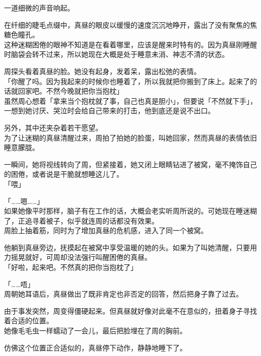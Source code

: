 一道细微的声音响起。

在纤细的睫毛点缀中，真昼的眼皮以缓慢的速度沉沉地睁开，露出了没有聚焦的焦糖色瞳孔。\\

这种迷糊困倦的眼神不知道是在看着哪里，应该是醒来时特有的。因为真昼刚睡醒时脑袋会转不过来，所以她现在大概是处于睡意未消、神志不清的状态。

周探头看着真昼的脸。她没有起身，发着呆，露出松弛的表情。\\

「你醒了吗。因为我起来的时候你也睡着了，所以我就把你搬到了床上。起来了的话就回家吧。不然今晚就把你当抱枕」\\

虽然周心想着「拿来当个抱枕就了事，自己也真是胆小」，但要说「不然就下手」，一想到她讨厌、哭泣时会给自己带来的打击，他到底还是说不出口。

另外，其中还夹杂着若干愿望。\\

为了让迷糊的真昼清醒过来，周拍了拍她的脸蛋，叫她回家，然而真昼的表情依旧睡意朦胧。

一瞬间，她将视线转向了周，但紧接着，她又闭上眼睛钻进了被窝，毫不掩饰自己的困倦，或者说是干脆就想睡这儿了。\\

「喂」

「……嗯……」\\

如果她像平时那样，脑子有在工作的话，大概会老实听周所说的。可她现在睡迷糊了，正追寻着被子，似乎就连周的话都没有效果。\\

周脸上抽着筋，同时为了增加真昼的危机感，进入了同一个被窝。

他躺到真昼旁边，抚摸起在被窝中享受温暖的她的头。如果为了叫她清醒，只要用力摇晃就好，可周却没法强行叫醒困倦的真昼。\\

「好啦，起来吧。不然真的把你当抱枕了」

「……唔」\\

周朝她耳语后，真昼做出了既非肯定也非否定的回答，然后把身子靠了过去。

由于事发突然，周变得僵硬起来。但真昼就好像对此毫不在意似的，扭着身子寻找着合适的位置。\\

她像毛毛虫一样蠕动了一会儿，最后把脸埋在了周的胸前。

仿佛这个位置正合适似的，真昼停下动作，静静地睡下了。\\

